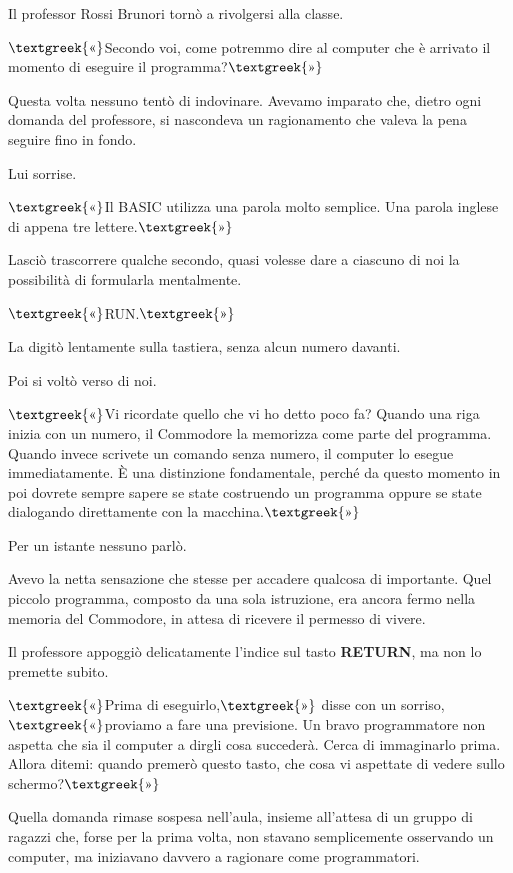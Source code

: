 \documentclass{article}
\begin{document}
Il professor Rossi Brunori tornò a rivolgersi alla classe.

$\text{\textgreek{«}}$Secondo voi, come potremmo dire al computer che è arrivato il momento di eseguire il
programma?$\text{\textgreek{»}}$

Questa volta nessuno tentò di indovinare. Avevamo imparato che, dietro ogni domanda del professore, si nascondeva un
ragionamento che valeva la pena seguire fino in fondo.

Lui sorrise.

$\text{\textgreek{«}}$Il BASIC utilizza una parola molto semplice. Una parola inglese di appena tre
lettere.$\text{\textgreek{»}}$

Lasciò trascorrere qualche secondo, quasi volesse dare a ciascuno di noi la possibilità di formularla mentalmente.

$\text{\textgreek{«}}$RUN.$\text{\textgreek{»}}$

La digitò lentamente sulla tastiera, senza alcun numero davanti.

Poi si voltò verso di noi.

$\text{\textgreek{«}}$Vi ricordate quello che vi ho detto poco fa? Quando una riga inizia con un numero, il Commodore la
memorizza come parte del programma. Quando invece scrivete un comando senza numero, il computer lo esegue
immediatamente. È una distinzione fondamentale, perché da questo momento in poi dovrete sempre sapere se state
costruendo un programma oppure se state dialogando direttamente con la macchina.$\text{\textgreek{»}}$

Per un istante nessuno parlò.

Avevo la netta sensazione che stesse per accadere qualcosa di importante. Quel piccolo programma, composto da una sola
istruzione, era ancora fermo nella memoria del Commodore, in attesa di ricevere il permesso di vivere.

Il professore appoggiò delicatamente l'indice sul tasto \textbf{RETURN}, ma non lo premette subito.

$\text{\textgreek{«}}$Prima di eseguirlo,$\text{\textgreek{»}}$ disse con un sorriso, $\text{\textgreek{«}}$proviamo a
fare una previsione. Un bravo programmatore non aspetta che sia il computer a dirgli cosa succederà. Cerca di
immaginarlo prima. Allora ditemi: quando premerò questo tasto, che cosa vi aspettate di vedere sullo
schermo?$\text{\textgreek{»}}$

Quella domanda rimase sospesa nell'aula, insieme all'attesa di un gruppo di ragazzi che, forse per la prima volta, non
stavano semplicemente osservando un computer, ma iniziavano davvero a ragionare come programmatori.
\end{document}
